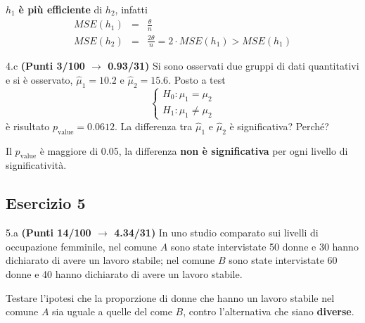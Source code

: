 \documentclass[
  11pt,
]{book}
\theoremstyle{mytheoremstyle}
\theoremstyle{mydefstyle}
\newenvironment{sol}
  {
  \begin{tcolorbox}[enhanced,breakable,arc=0.1mm,boxrule=1pt,colback=white,colframe=iblue,
  title=\bf \fontfamily{lmss}\selectfont \hspace{.5 cm} Soluzione,drop fuzzy shadow]

}{
\end{tcolorbox}
  }
\begin{document}
\begin{sol}
\(h_1\) \textbf{è più efficiente} di \(h_2\), infatti
\begin{eqnarray*}
MSE(h_1) &=&   \frac\theta n\\
MSE(h_2) &=&   \frac{2\theta} n =2\cdot MSE(h_1)>MSE(h_1)
\end{eqnarray*}

\end{sol}

4.c \textbf{(Punti 3/100 \(\rightarrow\) 0.93/31)} Si sono osservati due gruppi di dati quantitativi e si è osservato, \(\hat\mu_1=10.2\) e \(\hat\mu_2=15.6\). Posto a test
\[
\begin{cases}
H_0:\mu_1=\mu_2\\
H_1:\mu_1\ne \mu_2
\end{cases}
\]
è risultato \(p_\text{value}=0.0612\). La differenza tra \(\hat\mu_1\) e \(\hat\mu_2\) è significativa? Perché?

\begin{sol}
Il \(p_\text{value}\) è maggiore di 0.05, la differenza \textbf{non è significativa} per ogni livello di significatività.

\end{sol}

\subsection{Esercizio 5}\label{esercizio-5-1}

5.a \textbf{(Punti 14/100 \(\rightarrow\) 4.34/31)} In uno studio comparato sui livelli di occupazione femminile, nel comune \(A\) sono state intervistate 50 donne e 30 hanno dichiarato di avere un lavoro stabile; nel comune \(B\) sono state intervistate 60 donne e 40 hanno dichiarato di avere un lavoro stabile.

Testare l'ipotesi che la proporzione di donne che hanno un lavoro stabile nel comune \(A\) sia uguale a quelle del come \(B\), contro l'alternativa che siano \textbf{diverse}.
\end{document}

